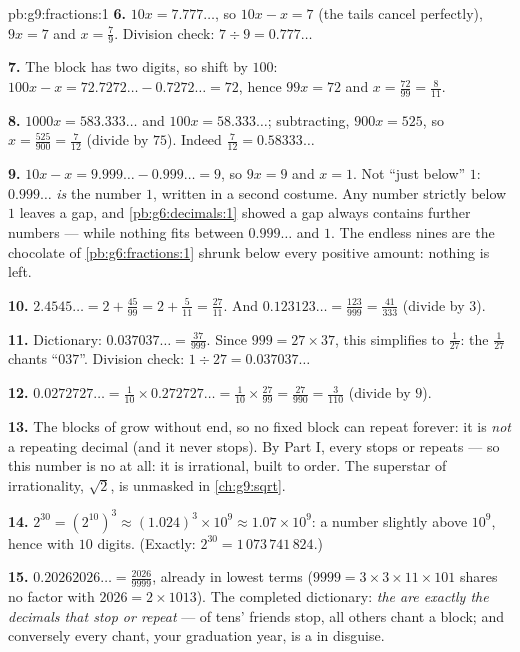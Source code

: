 \begin{solution}{pb:g9:fractions:1}
\textbf{6.} $10x = 7.777\ldots$, so $10x - x = 7$ (the tails
cancel perfectly), $9x = 7$ and $x = \frac79$. Division check:
$7 \div 9 = 0.777\ldots$

\textbf{7.} The block has two digits, so shift by $100$:
$100x - x = 72.7272\ldots - 0.7272\ldots = 72$, hence
$99x = 72$ and $x = \frac{72}{99} = \frac{8}{11}$.

\textbf{8.} $1000x = 583.333\ldots$ and $100x = 58.333\ldots$;
subtracting, $900x = 525$, so
$x = \frac{525}{900} = \frac{7}{12}$ (divide by $75$). Indeed
$\frac{7}{12} = 0.58333\ldots$

\textbf{9.} $10x - x = 9.999\ldots - 0.999\ldots = 9$, so
$9x = 9$ and $x = 1$. Not ``just below'' $1$:
$0.999\ldots$ \emph{is} the number $1$, written in a second
costume. Any number strictly below $1$ leaves a gap, and
\cref{pb:g6:decimals:1} showed a gap always contains further
numbers --- while nothing fits between $0.999\ldots$ and $1$.
The endless nines are the chocolate  of
\cref{pb:g6:fractions:1} shrunk below every positive amount:
nothing is left.

\textbf{10.} $2.4545\ldots = 2 + \frac{45}{99} = 2 +
\frac{5}{11} = \frac{27}{11}$. And
$0.123123\ldots = \frac{123}{999} = \frac{41}{333}$ (divide by
$3$).

\textbf{11.} Dictionary: $0.037037\ldots = \frac{37}{999}$.
Since $999 = 27 \times 37$, this simplifies to $\frac{1}{27}$:
the  $\frac{1}{27}$ chants ``$037$''. Division check:
$1 \div 27 = 0.037037\ldots$

\textbf{12.} $0.0272727\ldots = \frac{1}{10} \times
0.272727\ldots = \frac{1}{10} \times \frac{27}{99}
= \frac{27}{990} = \frac{3}{110}$ (divide by $9$).

\textbf{13.} The blocks of  grow without end, so no fixed
block can repeat forever: it is \emph{not} a repeating decimal
(and it never stops). By Part I, every  stops or
repeats --- so this number is no  at all: it is
irrational, built to order. The superstar of irrationality,
$\sqrt2$, is unmasked in \cref{ch:g9:sqrt}.

\textbf{14.} $2^{30} = \left(2^{10}\right)^3 \approx
(1.024)^3 \times 10^9 \approx 1.07 \times 10^9$: a number
slightly above $10^9$, hence with $10$ digits. (Exactly:
$2^{30} = 1\,073\,741\,824$.)

\textbf{15.} $0.20262026\ldots = \frac{2026}{9999}$, already in
lowest terms ($9999 = 3 \times 3 \times 11 \times 101$ shares
no factor with $2026 = 2 \times 1013$). The completed
dictionary: \emph{the  are exactly the decimals that
stop or repeat} ---  of tens' friends stop, all
others chant a block; and conversely every chant,  your
graduation year, is a  in disguise.
\end{solution}
